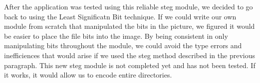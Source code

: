 After the application was tested using this reliable steg module, we decided to go back to using the Least Significatn Bit technique. If we  could write our own module from scratch that manipulated the bits in the picture, we figured it would be easier to place the file bits into the image. By being consistent in only manipulating bits throughout the module, we could avoid the type errors and inefficiences that would arise if we used the steg method described in the previous paragraph. This new steg module is not completed yet and has not been tested. If it works, it would allow us to encode entire directories.